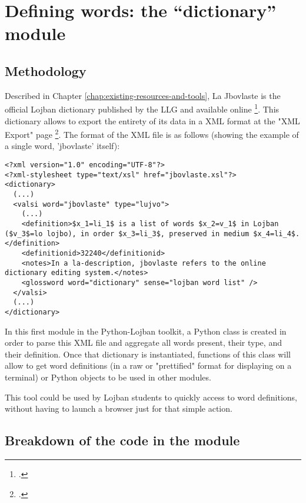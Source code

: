 \chapter{Defining words: the ``dictionary'' module}
\label{chap:creating_a_dictionary}

\section{Methodology}

Described in Chapter \ref{chap:existing-resources-and-tools}, La Jbovlaste is the official Lojban dictionary published by the LLG
and available online \footcite{jbovlaste}.
This dictionary allows to export the entirety of its data in a XML format at the "XML Export" page \footcite{jbovlaste-export}.
The format of the XML file is as follows (showing the example of a single word, 'jbovlaste' itself):

\begin{lstlisting}[caption=Example of word as defined in the official Lojban dictionary XML export]
<?xml version="1.0" encoding="UTF-8"?>
<?xml-stylesheet type="text/xsl" href="jbovlaste.xsl"?>
<dictionary>
  (...)
  <valsi word="jbovlaste" type="lujvo">
    (...)
    <definition>$x_1=li_1$ is a list of words $x_2=v_1$ in Lojban ($v_3$=lo lojbo), in order $x_3=li_3$, preserved in medium $x_4=li_4$.</definition>
    <definitionid>32240</definitionid>
    <notes>In a la-description, jbovlaste refers to the online dictionary editing system.</notes>
    <glossword word="dictionary" sense="lojban word list" />
  </valsi>
  (...)
</dictionary>
\end{lstlisting}

In this first module in the Python-Lojban toolkit, a Python class is created in order to parse this XML file and aggregate all words present,
their type, and their definition. Once that dictionary is instantiated, functions of this class will allow to get word definitions
(in a raw or "prettified" format for displaying on a terminal) or Python objects to be used in other modules.\newline

This tool could be used by Lojban students to quickly access to word definitions, without having to launch a browser just for that simple action.

\section{Breakdown of the code in the module}

